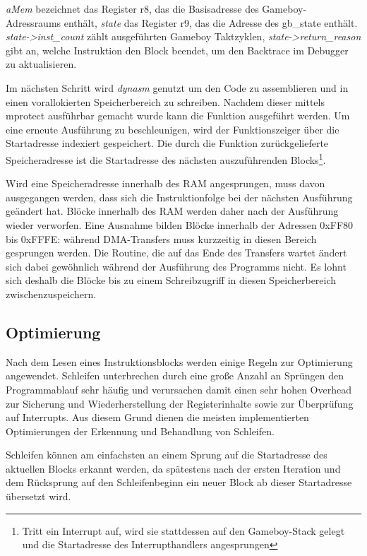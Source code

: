 \documentclass[a4paper]{scrartcl}
\begin{document}
\emph{aMem} bezeichnet das Register r8, das die Basisadresse des Gameboy-Adressraums enthält, \emph{state} das Register r9, das die Adresse des gb\_state enthält. \emph{state->inst\_count} zählt ausgeführten Gameboy Taktzyklen, \emph{state->return\_reason} gibt an, welche Instruktion den Block beendet, um den Backtrace im Debugger zu aktualisieren.

Im nächsten Schritt wird \emph{dynasm} genutzt um den Code zu assemblieren und in einen vorallokierten Speicherbereich zu schreiben. Nachdem dieser mittels mprotect ausführbar gemacht wurde kann die Funktion ausgeführt werden. Um eine erneute Ausführung zu beschleunigen, wird der Funktionszeiger über die Startadresse indexiert gespeichert. Die durch die Funktion zurückgelieferte Speicheradresse ist die Startadresse des nächsten auszuführenden Blocks\footnote{Tritt ein Interrupt auf, wird sie stattdessen auf den Gameboy-Stack gelegt und die Startadresse des Interrupthandlers angesprungen}.

Wird eine Speicheradresse innerhalb des RAM angesprungen, muss davon ausgegangen werden, dass sich die Instruktionfolge bei der nächsten Ausführung geändert hat. Blöcke innerhalb des RAM werden daher nach der Ausführung wieder verworfen. Eine Ausnahme bilden Blöcke innerhalb der Adressen 0xFF80 bis 0xFFFE: während DMA-Transfers muss kurzzeitig in diesen Bereich gesprungen werden. Die Routine, die auf das Ende des Transfers wartet ändert sich dabei gewöhnlich während der Ausführung des Programms nicht. Es lohnt sich deshalb die Blöcke bis zu einem Schreibzugriff in diesen Speicherbereich zwischenzuspeichern.

\subsection{Optimierung}

Nach dem Lesen eines Instruktionsblocks werden einige Regeln zur Optimierung angewendet. Schleifen unterbrechen durch eine große Anzahl an Sprüngen den Programmablauf sehr häufig und verursachen damit einen sehr hohen Overhead zur Sicherung und Wiederherstellung der Registerinhalte sowie zur Überprüfung auf Interrupts. Aus diesem Grund dienen die meisten implementierten Optimierungen der Erkennung und Behandlung von Schleifen.

Schleifen können am einfachsten an einem Sprung auf die Startadresse des aktuellen Blocks erkannt werden, da spätestens nach der ersten Iteration und dem Rücksprung auf den Schleifenbeginn ein neuer Block ab dieser Startadresse übersetzt wird.
\end{document}
